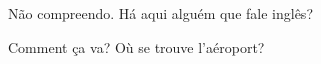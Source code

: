 ﻿\documentclass{article}
\begin{document}
Não compreendo. Há aqui alguém que fale inglês?

Comment ça va? Où se trouve l'aéroport?
\end{document}
